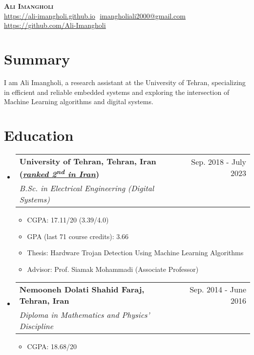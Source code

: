 \documentclass[letterpaper,11pt]{article}
\makeatletter
\newcommand{\resumeItem}[1]{
  \item\small{
    {#1 \vspace{-2pt}}
  }
}
\newcommand{\resumeSubheading}[4]{
  \vspace{-2pt}\item
    \begin{tabular*}{0.97\textwidth}[t]{l@{\extracolsep{\fill}}r}
      \textbf{#1} & #2 \\
      \textit{\small#3} & \textit{\small #4} \\
    \end{tabular*}\vspace{-7pt}
}
\newcommand{\resumeSubHeadingListStart}{\begin{itemize}[leftmargin=0.15in, label={}]}
\newcommand{\resumeSubHeadingListEnd}{\end{itemize}}
\newcommand{\resumeItemListStart}{\begin{itemize}}
\newcommand{\resumeItemListEnd}{\end{itemize}\vspace{-5pt}}
\makeatother
\begin{document}
\vspace{-7pt}

\begin{center}
    \textbf{\Huge \scshape Ali Imangholi} \\ \vspace{8pt}
    \small
    \href{https://ali-imangholi.github.io}
    {\underline{https://ali-imangholi.github.io}} $  $
    \href{mailto:imangholiali2000@gmail.com}
    {\underline{imangholiali2000@gmail.com}}
    \href{https://github.com/Ali-Imangholi}{\underline{https://github.com/Ali-Imangholi}} $  $
\end{center}

\section{Summary}
I am Ali Imangholi, a research assistant at the University of Tehran, specializing in efficient and reliable embedded systems and exploring the intersection of Machine Learning algorithms and digital systems.
\section{Education}
  \resumeSubHeadingListStart
  
    \resumeSubheading
      {University of Tehran, Tehran, Iran (\href{https://www.topuniversities.com/university-rankings/world-university-rankings/2024?\&countries=ir}{\textit{\underline{ranked 2\textsuperscript{nd} in Iran}}})}{Sep. 2018 - July 2023}
      {B.Sc. in Electrical Engineering (Digital Systems)}{}
        \resumeItemListStart
            \resumeItem{CGPA: 17.11/20 (3.39/4.0)}
            \resumeItem{GPA (last 71 course credits): 3.66 }
	\resumeItem{Thesis: Hardware Trojan Detection Using Machine Learning Algorithms}
	\resumeItem{Advisor: Prof. Siamak Mohammadi (Associate Professor)}
        \resumeItemListEnd

    \resumeSubheading
      {Nemooneh Dolati Shahid Faraj, Tehran, Iran}{Sep. 2014 - June 2016}
      {Diploma in Mathematics and Physics’ Discipline}{}
        \resumeItemListStart
            \resumeItem{CGPA: 18.68/20}
        \resumeItemListEnd
  \resumeSubHeadingListEnd

\end{document}
